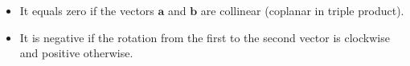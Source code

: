 \begin{itemize}
    \item It equals zero if the vectors $\mathbf a$ and $\mathbf b$ are collinear (coplanar in triple product).
    \item It is negative if the rotation from the first to the second vector is clockwise and positive otherwise.
\end{itemize}